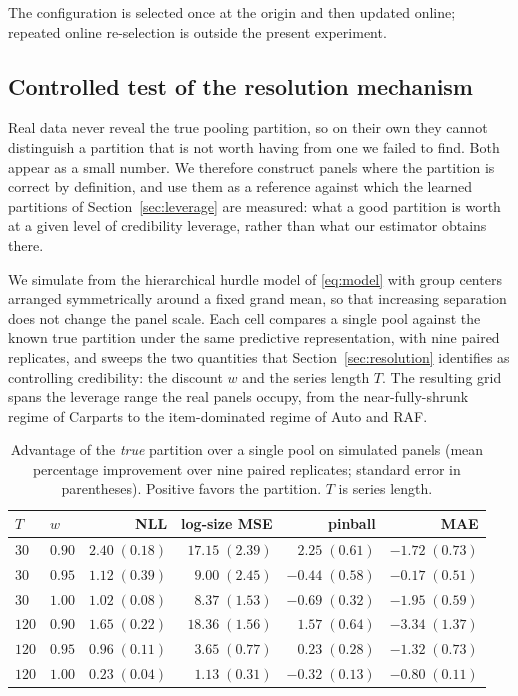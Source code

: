 The configuration is selected once at the origin and then updated online;
repeated online re-selection is outside the present experiment.



\subsection{Controlled test of the resolution mechanism}

\label{sec:synthetic}

Real data never reveal the true pooling partition, so on their own they
cannot distinguish a partition that is not worth having from one we failed
to find. Both appear as a small number. We therefore construct panels
where the partition is correct by definition, and use them as a reference
against which the learned partitions of Section~\ref{sec:leverage} are
measured: what a good partition is worth at a given level of credibility
leverage, rather than what our estimator obtains there.

We simulate from the hierarchical hurdle model of \eqref{eq:model} with
group centers arranged symmetrically around a fixed grand mean, so that
increasing separation does not change the panel scale. Each cell compares
a single pool against the known true partition under the same predictive
representation, with nine paired replicates, and sweeps the two quantities
that Section~\ref{sec:resolution} identifies as controlling credibility:
the discount $w$ and the series length $T$. The resulting grid spans the
leverage range the real panels occupy, from the near-fully-shrunk regime
of Carparts to the item-dominated regime of Auto and RAF.

\begin{table}[t]
\centering
\caption{Advantage of the \emph{true} partition over a single pool on
simulated panels (mean percentage improvement over nine paired replicates;
standard error in parentheses). Positive favors the partition. $T$ is
series length.}
\label{tab:sanity}
\small
\setlength{\tabcolsep}{3.5pt}
\begin{tabular}{llrrrr}
\toprule
$T$ & $w$ & NLL & log-size MSE & pinball & MAE\\
\midrule
$30$ & $0.90$ & $2.40\;(0.18)$ & $17.15\;(2.39)$ & $2.25\;(0.61)$ & $-1.72\;(0.73)$\\
$30$ & $0.95$ & $1.12\;(0.39)$ & $9.00\;(2.45)$ & $-0.44\;(0.58)$ & $-0.17\;(0.51)$\\
$30$ & $1.00$ & $1.02\;(0.08)$ & $8.37\;(1.53)$ & $-0.69\;(0.32)$ & $-1.95\;(0.59)$\\
$120$ & $0.90$ & $1.65\;(0.22)$ & $18.36\;(1.56)$ & $1.57\;(0.64)$ & $-3.34\;(1.37)$\\
$120$ & $0.95$ & $0.96\;(0.11)$ & $3.65\;(0.77)$ & $0.23\;(0.28)$ & $-1.32\;(0.73)$\\
$120$ & $1.00$ & $0.23\;(0.04)$ & $1.13\;(0.31)$ & $-0.32\;(0.13)$ & $-0.80\;(0.11)$\\
\bottomrule
\end{tabular}
\end{table}

